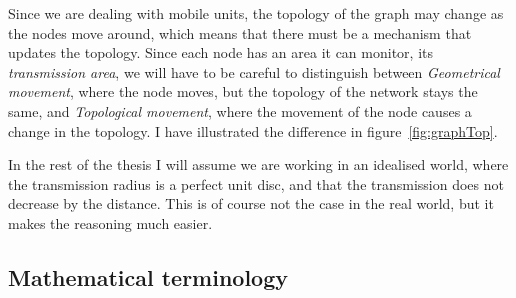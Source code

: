 Since we are dealing with mobile units, the topology of the graph may change as the nodes move around, which means that there must be a mechanism that updates the topology. Since each node has an area it can monitor, its \emph{transmission area}, we will have to be careful to distinguish between \emph{Geometrical movement}, where the node moves, but the topology of the network stays the same, and \emph{Topological movement}, where the movement of the node causes a change in the topology. I have illustrated the difference in figure~\ref{fig:graphTop}.

In the rest of the thesis I will assume we are working in an idealised world, where the transmission radius is a perfect unit disc, and that the transmission does not decrease by the distance. This is of course not the case in the real world, but it makes the reasoning much easier.

\subsection{Mathematical terminology}
